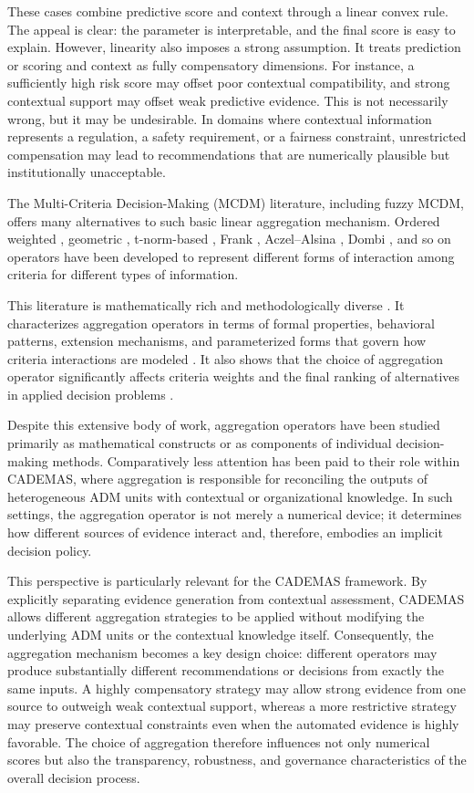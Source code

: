 \documentclass[mathematics,article,submit,moreauthors]{Definitions/mdpi}
\begin{document}
These cases combine predictive score and context through a linear convex rule. The appeal is clear: the parameter is interpretable, and the final score is easy to explain. However, linearity also imposes a strong assumption. It treats prediction or scoring and context as fully compensatory dimensions. For instance, a sufficiently high risk score may offset poor contextual compatibility, and strong contextual support may offset weak predictive evidence. This is not necessarily wrong, but it may be undesirable. In domains where contextual information represents a regulation, a safety requirement, or a fairness constraint, unrestricted compensation may lead to recommendations that are numerically plausible but institutionally unacceptable.

The Multi-Criteria Decision-Making (MCDM) literature, including fuzzy MCDM, offers many alternatives to such basic linear aggregation mechanism. Ordered weighted \citep{Yager1988}, geometric \citep{Tan2009}, t-norm-based \citep{Grabisch1996}, Frank \citep{Riaz2022}, Aczel--Alsina \citep{Senapati2022}, Dombi \citep{Akram2020}, and so on operators have been developed to represent different forms of interaction among criteria for different types of information. 

This literature is mathematically rich and methodologically diverse \citep{Mardani2018,Sun2018,Kahraman2015,Mardani2015}. It characterizes aggregation operators in terms of formal properties, behavioral patterns, extension mechanisms, and parameterized forms that govern how criteria interactions are modeled \citep{Sun2018}. It also shows that the choice of aggregation operator significantly affects criteria weights and the final ranking of alternatives in applied decision problems \citep{Petrovic2023}.


Despite this extensive body of work, aggregation operators have been studied primarily as mathematical constructs or as components of individual decision-making methods. Comparatively less attention has been paid to their role within CADEMAS, where aggregation is responsible for reconciling the outputs of heterogeneous ADM units with contextual or organizational knowledge. In such settings, the aggregation operator is not merely a numerical device; it determines how different sources of evidence interact and, therefore, embodies an implicit decision policy.

This perspective is particularly relevant for the CADEMAS framework. By explicitly separating evidence generation from contextual assessment, CADEMAS allows different aggregation strategies to be applied without modifying the underlying ADM units or the contextual knowledge itself. Consequently, the aggregation mechanism becomes a key design choice: different operators may produce substantially different recommendations or decisions from exactly the same inputs. A highly compensatory strategy may allow strong evidence from one source to outweigh weak contextual support, whereas a more restrictive strategy may preserve contextual constraints even when the automated evidence is highly favorable. The choice of aggregation therefore influences not only numerical scores but also the transparency, robustness, and governance characteristics of the overall decision process.
\end{document}

